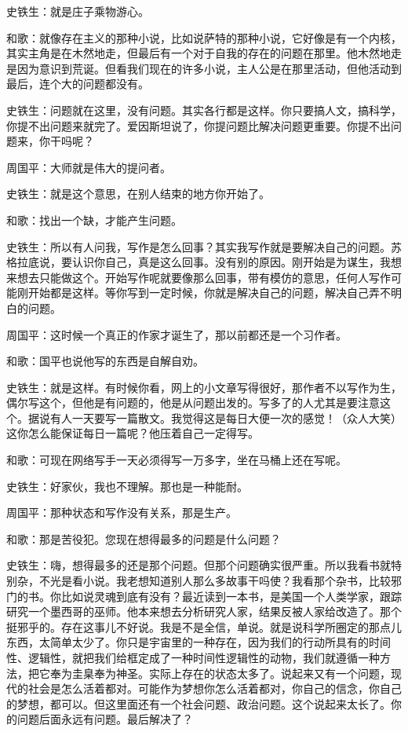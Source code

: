 \documentclass[12pt,a5paper]{ctexbook}
\begin{document}
史铁生：就是庄子乘物游心。

和歌：就像存在主义的那种小说，比如说萨特的那种小说，它好像是有一个内核，其实主角是在木然地走，但最后有一个对于自我的存在的问题在那里。他木然地走是因为意识到荒诞。但看我们现在的许多小说，主人公是在那里活动，但他活动到最后，连个大的问题都没有。

史铁生：问题就在这里，没有问题。其实各行都是这样。你只要搞人文，搞科学，你提不出问题来就完了。爱因斯坦说了，你提问题比解决问题更重要。你提不出问题来，你干吗呢？

周国平：大师就是伟大的提问者。

史铁生：就是这个意思，在别人结束的地方你开始了。

和歌：找出一个缺，才能产生问题。

史铁生：所以有人问我，写作是怎么回事？其实我写作就是要解决自己的问题。苏格拉底说，要认识你自己，真是这么回事。没有别的原因。刚开始是为谋生，我想来想去只能做这个。开始写作呢就要像那么回事，带有模仿的意思，任何人写作可能刚开始都是这样。等你写到一定时候，你就是解决自己的问题，解决自己弄不明白的问题。

周国平：这时候一个真正的作家才诞生了，那以前都还是一个习作者。

和歌：国平也说他写的东西是自解自劝。

史铁生：就是这样。有时候你看，网上的小文章写得很好，那作者不以写作为生，偶尔写这个，但他是有问题的，他是从问题出发的。写多了的人尤其是要注意这个。据说有人一天要写一篇散文。我觉得这是每日大便一次的感觉！（众人大笑）这你怎么能保证每日一篇呢？他压着自己一定得写。

和歌：可现在网络写手一天必须得写一万多字，坐在马桶上还在写呢。

史铁生：好家伙，我也不理解。那也是一种能耐。

周国平：那种状态和写作没有关系，那是生产。

和歌：那是苦役犯。您现在想得最多的问题是什么问题？

史铁生：嗨，想得最多的还是那个问题。但那个问题确实很严重。所以我看书就特别杂，不光是看小说。我老想知道别人那么多故事干吗使？我看那个杂书，比较邪门的书。你比如说灵魂到底有没有？最近读到一本书，是美国一个人类学家，跟踪研究一个墨西哥的巫师。他本来想去分析研究人家，结果反被人家给改造了。那个挺邪乎的。存在这事儿不好说。我是不是全信，单说。就是说科学所圈定的那点儿东西，太简单太少了。你只是宇宙里的一种存在，因为我们的行动所具有的时间性、逻辑性，就把我们给框定成了一种时间性逻辑性的动物，我们就遵循一种方法，把它奉为圭臬奉为神圣。实际上存在的状态太多了。说起来又有一个问题，现代的社会是怎么活着都对。可能作为梦想你怎么活着都对，你自己的信念，你自己的梦想，都可以。但这里面还有一个社会问题、政治问题。这个说起来太长了。你的问题后面永远有问题。最后解决了？
\end{document}
